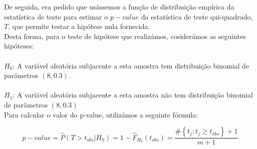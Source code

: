 \documentclass{article}
\begin{document}
				De seguida, era pedido que usássemos a função de distribuição empírica da estatística de teste para estimar o $p-value$ da estatística de teste qui-quadrado, $T$, que permite testar a hipótese nula fornecida.\\
				Desta forma, para o teste de hipótese que realizámos, cosiderámos as seguintes hipóteses:\\\\
				\indent $H_0$: A variável aleatória subjacente a esta amostra tem distribuição binomial de parâmetros $(8, 0.3)$.\\\\
				\indent $H_1$: A variável aleatória subjacente a esta amostra não tem distribuição binomial de parâmetros $(8, 0.3)$\\
				

				Para calcular o valor do p-value, utilizámos a seguinte fórmula:

			 	\begin{equation*}
					p-value = \hat{P}(T > t_{obs}|H_0) = 1 - \hat{F}_{H_0}(t_{obs}) =
							\frac{\# \left \{ t_j : t_j \geq t_{obs} \right \} + 1}{m + 1}
				\end{equation*}
				
\end{document}
